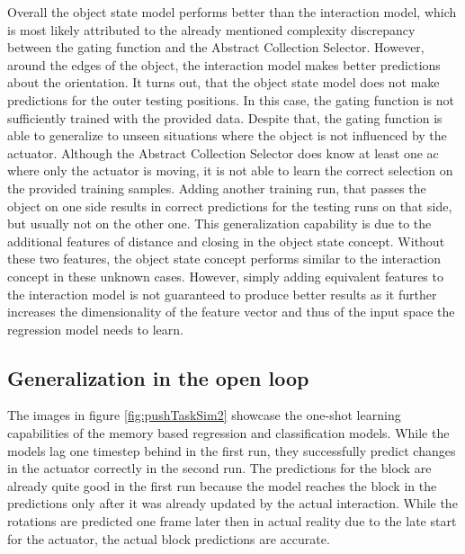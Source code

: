 Overall the object state model performs better than the interaction model, which is most likely attributed to the already mentioned complexity discrepancy between the gating function and the Abstract Collection Selector. 
However, around the edges of the object, the interaction model makes better predictions about the orientation. It turns out, that the object state model does not make predictions for the outer testing positions. In this case, the gating function is not sufficiently trained with the provided data.
Despite that, the gating function is able to generalize to unseen situations where the object is not influenced by the actuator. Although the Abstract Collection Selector does know at least one \gls{ac} where only the actuator is moving, it is not able to learn the correct selection on the provided training samples.
Adding another training run, that passes the object on one side results in correct predictions for the testing runs on that side, but usually not on the other one.
This generalization capability is due to the additional features of distance and closing in the object state concept. Without these two features, the object state concept performs similar to the interaction concept in these unknown cases.
However, simply adding equivalent features to the interaction model is not guaranteed to produce better results as it further increases the dimensionality of the feature vector and thus of the input space the regression model needs to learn. %


\subsection{Generalization in the open loop} %

The images in figure \ref{fig:pushTaskSim2} showcase the one-shot learning capabilities of the memory based regression and classification models. While the models lag one timestep behind in the first run, they successfully predict changes in the actuator correctly in the second run. 
The predictions for the block are already quite good in the first run because the model reaches the block in the predictions only after it was already updated by the actual interaction. While the rotations are predicted one frame later then in actual reality due to the late start for the actuator, the actual block predictions are accurate.

